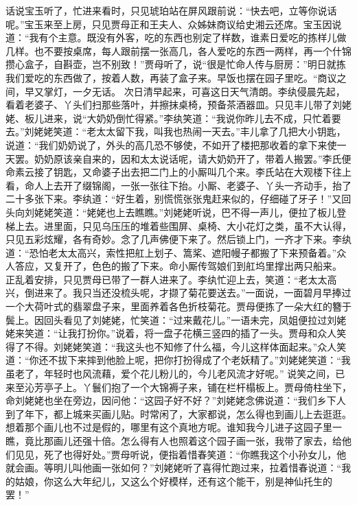 \documentclass[12pt,oneside]{book}
\begin{document}
话说宝玉听了，忙进来看时，只见琥珀站在屏风跟前说：“快去吧，立等你说话呢。”宝玉来至上房，只见贾母正和王夫人、众姊妹商议给史湘云还席。宝玉因说道：“我有个主意。既没有外客，吃的东西也别定了样数，谁素日爱吃的拣样儿做几样。也不要按桌席，每人跟前摆一张高几，各人爱吃的东西一两样，再一个什锦攒心盒子，自斟壶，岂不别致！”贾母听了，说“很是忙命人传与厨房：”明日就拣我们爱吃的东西做了，按着人数，再装了盒子来。早饭也摆在园子里吃。“商议之间，早又掌灯，一夕无话。
次日清早起来，可喜这日天气清朗。李纨侵晨先起，看着老婆子、丫头们扫那些落叶，并擦抹桌椅，预备茶酒器皿。只见丰儿带了刘姥姥、板儿进来，说“大奶奶倒忙得紧。”李纨笑道：“我说你昨儿去不成，只忙着要去。”刘姥姥笑道：“老太太留下我，叫我也热闹一天去。”丰儿拿了几把大小钥匙，说道：“我们奶奶说了，外头的高几恐不够使，不如开了楼把那收着的拿下来使一天罢。奶奶原该亲自来的，因和太太说话呢，请大奶奶开了，带着人搬罢。”李氏便命素云接了钥匙，又命婆子出去把二门上的小厮叫几个来。李氏站在大观楼下往上看，命人上去开了缀锦阁，一张一张往下抬。小厮、老婆子、丫头一齐动手，抬了二十多张下来。李纨道：“好生着，别慌慌张张鬼赶来似的，仔细碰了牙子！”又回头向刘姥姥笑道：“姥姥也上去瞧瞧。”刘姥姥听说，巴不得一声儿，便拉了板儿登梯上去。进里面，只见乌压压的堆着些围屏、桌椅、大小花灯之类，虽不大认得，只见五彩炫耀，各有奇妙。念了几声佛便下来了。然后锁上门，一齐才下来。李纨道：“恐怕老太太高兴，索性把舡上划子、篙桨、遮阳幔子都搬了下来预备着。”众人答应，又复开了，色色的搬了下来。命小厮传驾娘们到舡坞里撑出两只船来。
正乱着安排，只见贾母已带了一群人进来了。李纨忙迎上去，笑道：“老太太高兴，倒进来了。我只当还没梳头呢，才撷了菊花要送去。”一面说，一面碧月早捧过一个大荷叶式的翡翠盘子来，里面养着各色折枝菊花。贾母便拣了一朵大红的簪于鬓上。因回头看见了刘姥姥，忙笑道：“过来戴花儿。”一语未完，凤姐便拉过刘姥姥来笑道：“让我打扮你。”说着，将一盘子花横三竖四的插了一头。贾母和众人笑得了不得。刘姥姥笑道：“我这头也不知修了什么福，今儿这样体面起来。”众人笑道：“你还不拔下来摔到他脸上呢，把你打扮得成了个老妖精了。”刘姥姥笑道：“我虽老了，年轻时也风流藉，爱个花儿粉儿的，今儿老风流才好呢。”
说笑之间，已来至沁芳亭子上。丫鬟们抱了一个大锦褥子来，铺在栏杆榻板上。贾母倚柱坐下，命刘姥姥也坐在旁边，因问他：“这园子好不好？”刘姥姥念佛说道：“我们乡下人到了年下，都上城来买画儿贴。时常闲了，大家都说，怎么得也到画儿上去逛逛。想着那个画儿也不过是假的，哪里有这个真地方呢。谁知我今儿进子这园子里一瞧，竟比那画儿还强十倍。怎么得有人也照着这个园子画一张，我带了家去，给他们见见，死了也得好处。”贾母听说，便指着惜春笑道：“你瞧我这个小孙女儿，他就会画。等明儿叫他画一张如何？”刘姥姥听了喜得忙跑过来，拉着惜春说道：“我的姑娘，你这么大年纪儿，又这么个好模样，还有这个能干，别是神仙托生的罢！”
\end{document}
